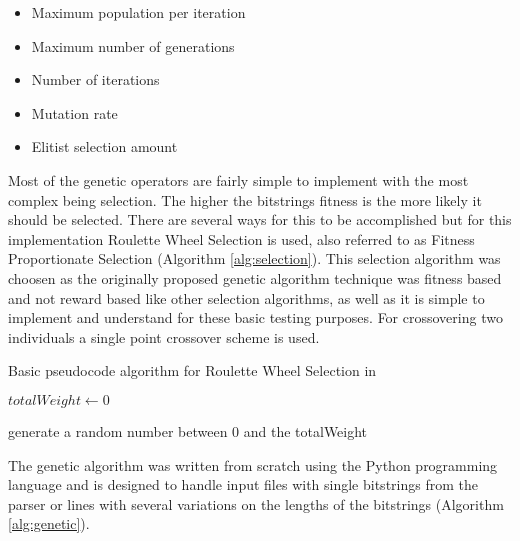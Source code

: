 \begin{itemize}
	\item Maximum population per iteration
	\item Maximum number of generations
	\item Number of iterations
	\item Mutation rate
	\item Elitist selection amount
\end{itemize}

Most of the genetic operators are fairly simple to implement with the most complex being selection.  The higher the bitstrings fitness is the more likely it should be selected.  There are several ways for this to be accomplished but for this implementation Roulette Wheel Selection is used, also referred to as Fitness Proportionate Selection (Algorithm \ref{alg:selection}).  This selection algorithm was choosen as the originally proposed genetic algorithm technique was fitness based %
 and not reward based like other selection algorithms, as well as it is simple to implement and understand for these basic testing purposes.  For crossovering two individuals a single point crossover scheme is used.

\begin{algorithm}[H]
	\label{alg:selection}
	\caption{Basic pseudocode algorithm for Roulette Wheel Selection in }
	
	$totalWeight\leftarrow0$\;
	
	generate a random number between 0 and the totalWeight\;
	
\end{algorithm}

The genetic algorithm was written from scratch using the Python programming language and is designed to handle input files with single bitstrings from the parser or lines with several variations on the lengths of the bitstrings (Algorithm \ref{alg:genetic}).

